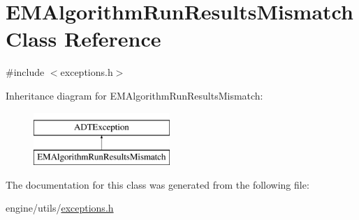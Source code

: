 \hypertarget{classEMAlgorithmRunResultsMismatch}{
\section{EMAlgorithmRunResultsMismatch Class Reference}
\label{classEMAlgorithmRunResultsMismatch}
}


{\ttfamily \#include $<$exceptions.h$>$}

Inheritance diagram for EMAlgorithmRunResultsMismatch:\begin{figure}[H]
\begin{center}
\leavevmode
\includegraphics[height=2cm]{classEMAlgorithmRunResultsMismatch}
\end{center}
\end{figure}


The documentation for this class was generated from the following file:\begin{DoxyCompactItemize}
\item 
engine/utils/\hyperlink{exceptions_8h}{exceptions.h}\end{DoxyCompactItemize}
